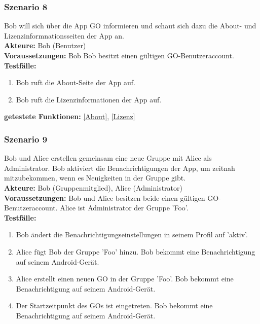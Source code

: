 \documentclass[parskip=full]{scrartcl}
\def\threedigits#1{%
  \ifnum#1<100 0\fi
  \ifnum#1<10 0\fi
  \number#1}
\begin{document}
\subsubsection*{Szenario 8} Bob will sich über die App GO informieren und schaut sich dazu die About- und Lizenzinformnationsseiten der App an.\\

\textbf{Akteure: }Bob (Benutzer)\\

\textbf{Voraussetzungen: }Bob Bob besitzt einen gültigen GO-Benutzeraccount.\\

\textbf{Testfälle:}
\begin{enumerate}[label={\textbf{/T\protect\threedigits{\theenumi}0/}}, leftmargin=*, resume]
	\item Bob ruft die About-Seite der App auf.
	\item Bob ruft die Lizenzinformationen der App auf.
\end{enumerate}

\textbf{getestete Funktionen: }\ref{About}, \ref{Lizenz}

\subsubsection*{Szenario 9} Bob und Alice erstellen gemeinsam eine neue Gruppe mit Alice als Administrator. Bob aktiviert die Benachrichtigungen der App, um zeitnah mitzubekommen, wenn es Neuigkeiten in der Gruppe gibt.\\

\textbf{Akteure: }Bob (Gruppenmitglied), Alice (Administrator)\\

\textbf{Voraussetzungen: }Bob und Alice besitzen beide einen gültigen GO-Benutzeraccount. Alice ist Administrator der Gruppe 'Foo'.\\

\textbf{Testfälle:}
\begin{enumerate}[label={\textbf{/T\protect\threedigits{\theenumi}0/}}, leftmargin=*, resume]
	\item Bob ändert die Benachrichtigungseinstellungen in seinem Profil auf 'aktiv'.
	\item Alice fügt Bob der Gruppe 'Foo' hinzu. Bob bekommt eine Benachrichtigung auf seinem Android-Gerät.
	\item Alice erstellt einen neuen GO in der Gruppe 'Foo'. Bob bekommt eine Benachrichtigung auf seinem Android-Gerät.
	\item Der Startzeitpunkt des GOs ist eingetreten. Bob bekommt eine Benachrichtigung auf seinem Android-Gerät.
\end{enumerate}
\end{document}
